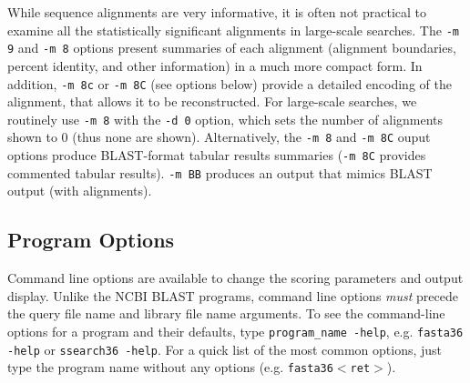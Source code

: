 \documentclass[11pt]{article}
\begin{document}
While sequence alignments are very informative, it is often not
practical to examine all the statistically significant alignments in
large-scale searches. The \texttt{-m 9} and \texttt{-m 8} options
present summaries of each alignment (alignment boundaries, percent
identity, and other information) in a much more compact form.  In
addition, \texttt{-m 8c} or \texttt{-m 8C} (see options below) provide
a detailed encoding of the alignment, that allows it to be
reconstructed. For large-scale searches, we routinely use \texttt{-m
  8} with the \texttt{-d 0} option, which sets the number of 
alignments shown to 0 (thus none are shown).  Alternatively, the
\texttt{-m 8} and \texttt{-m 8C} ouput options produce BLAST-format
tabular results summaries (\texttt{-m 8C} provides commented tabular
results).  \texttt{-m BB} produces an output that mimics BLAST output
(with alignments).

\subsection{Program Options}

Command line options are available to change the scoring parameters
and output display. Unlike the NCBI BLAST programs, command line
options \emph{must} precede the query file name and library file name
arguments.  To see the command-line options for a program and their
defaults, type \texttt{program\_name -help}, e.g. \texttt{fasta36
  -help} or \texttt{ssearch36 -help}. For a quick list of the most
common options, just type the program name without any options
(e.g. \texttt{fasta36$<$ret$>$}).
\end{document}
